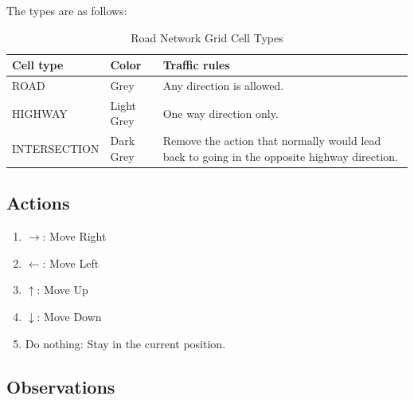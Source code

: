 \documentclass{scrartcl}
\theoremstyle{mytheoremstyle}
\theoremstyle{mytheoremstyle}
\theoremstyle{myproblemstyle}
\begin{document}
The types are as follows:

\begin{table}[H]
    \centering
    \begin{tabularx}{\textwidth}{|Y|Y|M{0.5\textwidth}|}
        \hline
        \textbf{Cell type}
         & \textbf{Color}
         & \textbf{Traffic rules}                                                                      \\\hline
        ROAD
         & Grey
         & Any direction is allowed.                                                                   \\\hline
        HIGHWAY
         & Light Grey
         & One way direction only.                                                                     \\\hline
        INTERSECTION
         & Dark Grey
         & Remove the action that normally would lead back to going in the opposite highway direction. \\\hline
    \end{tabularx}
    \caption{Road Network Grid Cell Types}
    \label{tab:road_cells}
\end{table}

\subsection{Actions}

\begin{enumerate}
    \item $\rightarrow$: Move Right
    \item $\leftarrow$: Move Left
    \item $\uparrow$: Move Up
    \item $\downarrow$: Move Down
    \item Do nothing: Stay in the current position.
\end{enumerate}

\subsection{Observations}
\end{document}
